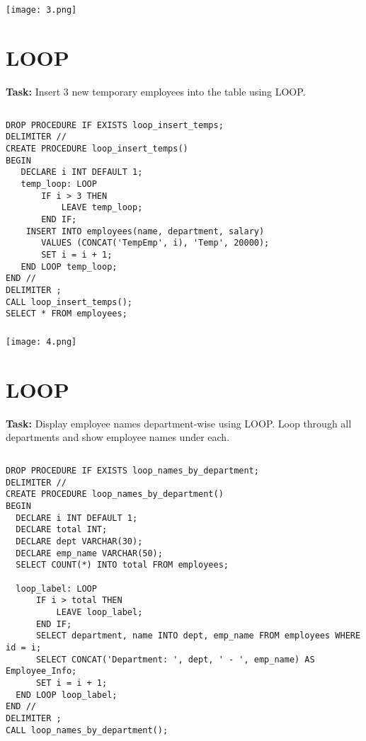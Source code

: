 \documentclass[12pt,a4paper]{article}
\begin{document}
\subsubsection{}
\begin{center}
    \texttt{[image: 3.png]}
\end{center}


\section{LOOP}
\textbf{Task:} Insert 3 new temporary employees into the table using LOOP.

\subsection{}
\begin{lstlisting}
DROP PROCEDURE IF EXISTS loop_insert_temps;
DELIMITER //
CREATE PROCEDURE loop_insert_temps()
BEGIN
   DECLARE i INT DEFAULT 1;
   temp_loop: LOOP
       IF i > 3 THEN
           LEAVE temp_loop;
       END IF;
	INSERT INTO employees(name, department, salary)
       VALUES (CONCAT('TempEmp', i), 'Temp', 20000);
       SET i = i + 1;
   END LOOP temp_loop;
END //
DELIMITER ;
CALL loop_insert_temps();
SELECT * FROM employees;

\end{lstlisting}

\subsubsection{}
\begin{center}
    \texttt{[image: 4.png]}
\end{center}


\section{LOOP}
\textbf{Task:} Display employee names department-wise using LOOP.
Loop through all departments and show employee names under each.

\subsection{}
\begin{lstlisting}
DROP PROCEDURE IF EXISTS loop_names_by_department;
DELIMITER //
CREATE PROCEDURE loop_names_by_department()
BEGIN
  DECLARE i INT DEFAULT 1;
  DECLARE total INT;
  DECLARE dept VARCHAR(30);
  DECLARE emp_name VARCHAR(50);
  SELECT COUNT(*) INTO total FROM employees;

  loop_label: LOOP
      IF i > total THEN
          LEAVE loop_label;
      END IF;
      SELECT department, name INTO dept, emp_name FROM employees WHERE id = i;
      SELECT CONCAT('Department: ', dept, ' - ', emp_name) AS Employee_Info;
      SET i = i + 1;
  END LOOP loop_label;
END //
DELIMITER ;
CALL loop_names_by_department();

\end{lstlisting}
\end{document}
